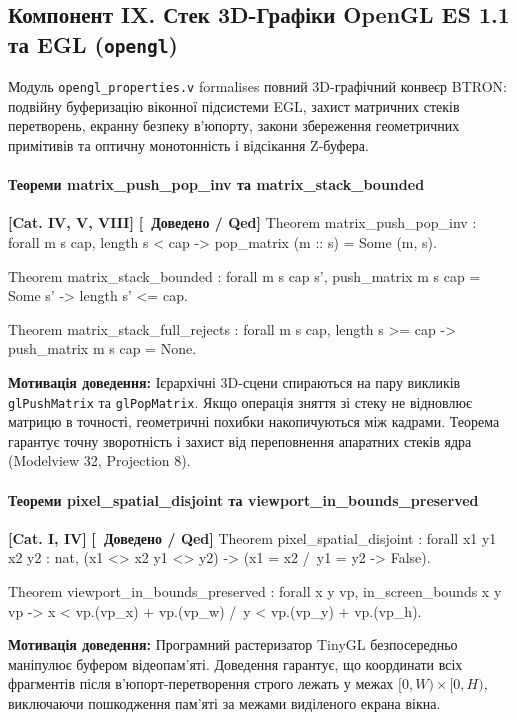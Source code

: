 \documentclass{article}
\let\originalfootnotesize\footnotesize
\let\oldverbatim\verbatim
\let\oldendverbatim\endverbatim
\renewenvironment{verbatim}{\originalfootnotesize\oldverbatim}{\oldendverbatim}
\newcommand{\thmcategory}[1]{{\small\textbf{\color{coreblue}[#1]}}}
\newcommand{\thmproven}{{\small\textbf{\color{productgreen}[\checkmark\ Доведено / Qed]}}}
\newcommand{\thmmotivation}[1]{%
  \par\smallskip\noindent\colorbox{boxbg}{\parbox{\dimexpr\linewidth-2\fboxsep\relax}{%
    \small\textbf{Мотивація доведення:} #1%
  }}\par\medskip
}
\begin{document}
\subsection[Компонент IX. Стек 3D-Графіки OpenGL ES]{Компонент IX. Стек 3D-Графіки OpenGL ES 1.1 та EGL (\texttt{opengl})}

Модуль \texttt{opengl\_properties.v} formalises повний 3D-графічний конвеєр BTRON: подвійну буферизацію віконної підсистеми EGL, захист матричних стеків перетворень, екранну безпеку в'юпорту, закони збереження геометричних примітивів та оптичну монотонність і відсікання Z-буфера.

\paragraph{Теореми matrix\_push\_pop\_inv та matrix\_stack\_bounded} \thmcategory{Cat. IV, V, VIII} \thmproven
\begin{verbatim}
Theorem matrix_push_pop_inv : forall m s cap,
  length s < cap ->
  pop_matrix (m :: s) = Some (m, s).

Theorem matrix_stack_bounded : forall m s cap s',
  push_matrix m s cap = Some s' ->
  length s' <= cap.

Theorem matrix_stack_full_rejects : forall m s cap,
  length s >= cap ->
  push_matrix m s cap = None.
\end{verbatim}
\thmmotivation{Ієрархічні 3D-сцени спираються на пару викликів \texttt{glPushMatrix} та \texttt{glPopMatrix}. Якщо операція зняття зі стеку не відновлює матрицю в точності, геометричні похибки накопичуються між кадрами. Теорема гарантує точну зворотність і захист від переповнення апаратних стеків ядра (Modelview 32, Projection 8).}

\paragraph{Теореми pixel\_spatial\_disjoint та viewport\_in\_bounds\_preserved} \thmcategory{Cat. I, IV} \thmproven
\begin{verbatim}
Theorem pixel_spatial_disjoint : forall x1 y1 x2 y2 : nat,
  (x1 <> x2 \/ y1 <> y2) ->
  (x1 = x2 /\ y1 = y2 -> False).

Theorem viewport_in_bounds_preserved : forall x y vp,
  in_screen_bounds x y vp ->
  x < vp.(vp_x) + vp.(vp_w) /\ y < vp.(vp_y) + vp.(vp_h).
\end{verbatim}
\thmmotivation{Програмний растеризатор TinyGL безпосередньо маніпулює буфером відеопам'яті. Доведення гарантує, що координати всіх фрагментів після в'юпорт-перетворення строго лежать у межах $[0, W) \times [0, H)$, виключаючи пошкодження пам'яті за межами виділеного екрана вікна.}
\end{document}
